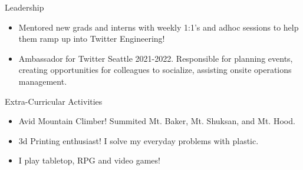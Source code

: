\begin{rSection}{Leadership} 
    \begin{itemize}
        \item Mentored new grads and interns with weekly 1:1's and adhoc sessions to help them ramp up into Twitter Engineering!
        \item Ambassador for Twitter Seattle 2021-2022. Responsible for planning events, creating opportunities for colleagues to socialize, assisting onsite operations management.
    \end{itemize}
\end{rSection}
\begin{rSection}{Extra-Curricular Activities} 
    \begin{itemize}
        \item Avid Mountain Climber! Summited Mt. Baker, Mt. Shuksan, and Mt. Hood. 
        \item 3d Printing enthusiast! I solve my everyday problems with plastic.
        \item I play tabletop, RPG and video games! 
    \end{itemize}
\end{rSection}


